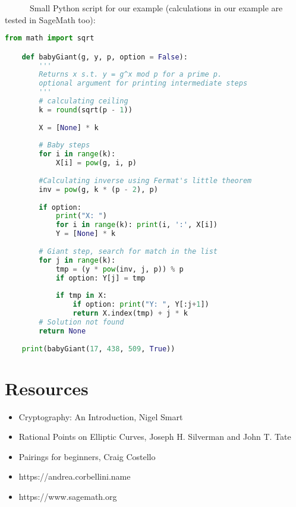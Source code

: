 \documentclass[fleqn,10pt]{olplainarticle}
\begin{document}
\par \ \ \ \ \ \ Small Python script for our example (calculations in our 
example are tested in SageMath too):
\begin{lstlisting}[language=Python]
    from math import sqrt

    def babyGiant(g, y, p, option = False):
        '''
        Returns x s.t. y = g^x mod p for a prime p.
        optional argument for printing intermediate steps
        '''
        # calculating ceiling
        k = round(sqrt(p - 1))
    
        X = [None] * k
    
        # Baby steps
        for i in range(k):
            X[i] = pow(g, i, p)
        
        #Calculating inverse using Fermat's little theorem
        inv = pow(g, k * (p - 2), p)
        
        if option:
            print("X: ")
            for i in range(k): print(i, ':', X[i])
            Y = [None] * k
            
        # Giant step, search for match in the list
        for j in range(k):
            tmp = (y * pow(inv, j, p)) % p
            if option: Y[j] = tmp
    
            if tmp in X:
                if option: print("Y: ", Y[:j+1])
                return X.index(tmp) + j * k 
        # Solution not found
        return None
    
    print(babyGiant(17, 438, 509, True))
\end{lstlisting}

\section*{Resources}

\begin{itemize}[noitemsep] 
    \item Cryptography: An Introduction, Nigel Smart 
    \item  Rational Points on Elliptic Curves, Joseph H. Silverman and 
    John T. Tate
    \item Pairings for beginners, Craig Costello
    \item https://andrea.corbellini.name
    \item https://www.sagemath.org
\end{itemize}
\end{document}
